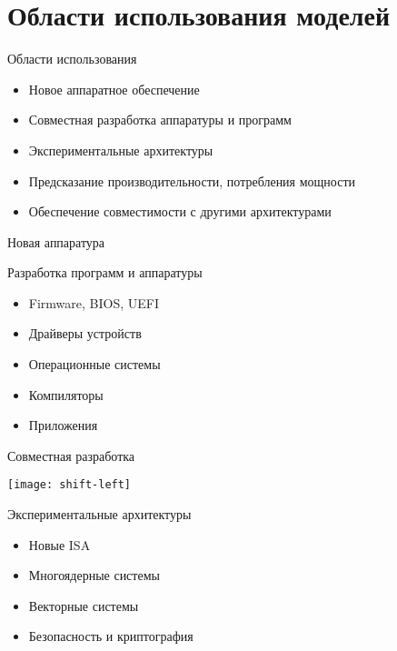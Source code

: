 \section{Области использования моделей}

\begin{frame}{Области использования}

\begin{itemize}
\item Новое аппаратное обеспечение
\item Совместная разработка аппаратуры и программ
\item Экспериментальные архитектуры
\item Предсказание производительности, потребления мощности
\item Обеспечение совместимости с другими архитектурами
\end{itemize}

\end{frame}


\begin{frame}{Новая аппаратура}


\end{frame}

\begin{frame}{Разработка программ и аппаратуры}

\begin{itemize}
\item Firmware, BIOS, UEFI
\item Драйверы устройств
\item Операционные системы
\item Компиляторы
\item Приложения
\end{itemize}

\end{frame}

\begin{frame}{Совместная разработка}

\texttt{[image: shift-left]} %

\end{frame}

\begin{frame}{Экспериментальные архитектуры}

\begin{itemize}
\item Новые ISA
\item Многоядерные системы
\item Векторные системы
\item Безопасность и криптография
\end{itemize}

\end{frame}

